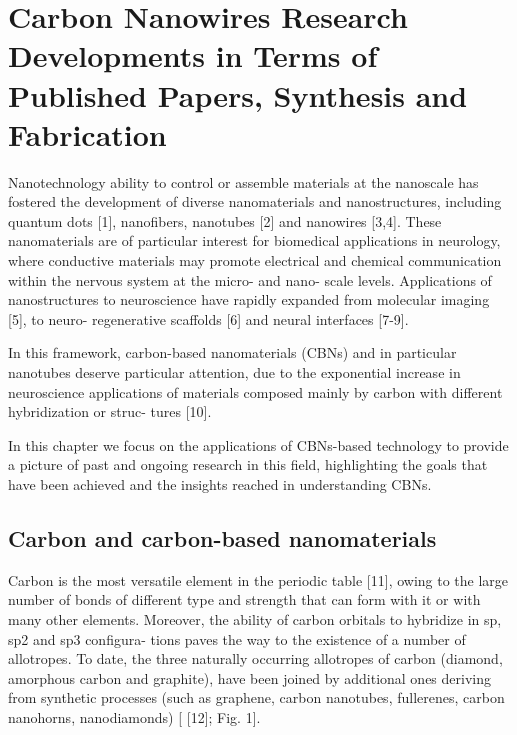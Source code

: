 
\chapter{Carbon Nanowires Research Developments in Terms of Published Papers, Synthesis and Fabrication} %

\label{Chapter:2}

Nanotechnology ability to control or assemble materials at the nanoscale has fostered the development of diverse nanomaterials and nanostructures, including quantum dots [1], nanofibers, nanotubes [2] and nanowires [3,4]. These nanomaterials are of particular interest for biomedical applications in neurology, where conductive materials may promote electrical and chemical communication within the nervous system at the micro- and nano- scale levels. Applications of nanostructures to neuroscience have rapidly expanded from molecular imaging [5], to neuro- regenerative scaffolds [6] and neural interfaces [7-9]. 

In this framework, carbon-based nanomaterials (CBNs) and in particular nanotubes deserve particular attention, due to the exponential increase in neuroscience applications of materials composed mainly by carbon with different hybridization or struc- tures [10].

In this chapter we focus on the applications of CBNs-based technology to provide a picture of past and ongoing research in this field, highlighting the goals that have been achieved and the insights reached in understanding CBNs.

\section{Carbon and carbon-based nanomaterials}

Carbon is the most versatile element in the periodic table [11], owing to the large number of bonds of different type and strength that can form with it or with many other elements. Moreover, the ability of carbon orbitals to hybridize in sp, sp2 and sp3 configura- tions paves the way to the existence of a number of allotropes. To date, the three naturally occurring allotropes of carbon (diamond, amorphous carbon and graphite), have been joined by additional ones deriving from synthetic processes (such as graphene, carbon nanotubes, fullerenes, carbon nanohorns, nanodiamonds) [ [12]; Fig. 1].

